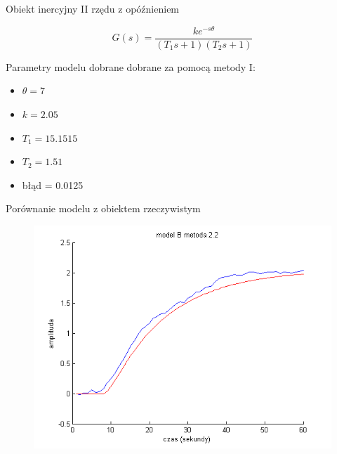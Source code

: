 \documentclass{beamer}
\begin{document}
\begin{frame}{Obiekt inercyjny II rzędu z opóźnieniem }

\begin{equation*}
G(s) = \frac{k e^{-s \theta}}{(T_1 s + 1)(T_2 s + 1)}
\end{equation*}

Parametry modelu dobrane dobrane za pomocą metody I:

\begin{itemize}
\item $\theta = 7$
\item $k =  2.05$
\item $T_1 = 15.1515$
\item $T_2 = 1.51$
\item błąd = 0.0125
\end{itemize}

\end{frame}


\begin{frame}{Porównanie modelu z obiektem rzeczywistym}

\begin{figure}
\includegraphics[width = \linewidth]{B_2_2}
\end{figure}

\end{frame}
\end{document}
